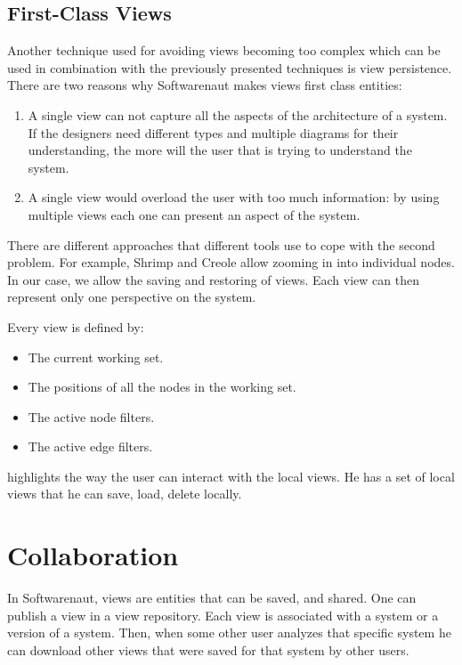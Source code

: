 \documentclass[preprint,12pt]{elsarticle}
\begin{document}
\newpage
\subsection {First-Class Views}

Another technique used for avoiding views becoming too complex which can be used in combination with the previously presented techniques is view persistence. There are two reasons why Softwarenaut makes views first class entities:

\begin{enumerate}
\item A single view can not capture all the aspects of the architecture of a system. If the designers need different types and multiple diagrams for their understanding, the more will the user that is trying to understand the system. 
\item A single view would overload the user with too much information: by using multiple views each one can present an aspect of the system.
\end{enumerate}

There are different approaches that different tools use to cope with the second problem. For example, Shrimp and Creole allow zooming in into individual nodes. In our case, we allow the saving and restoring of views. Each view can then represent only one perspective on the system. 

Every view is defined by:

\begin{itemize}
\item The current working set.
\item The positions of all the nodes in the working set.
\item The active node filters.
\item The active edge filters.
\end{itemize}


 highlights the way the user can interact with the local views. He has a set of local views that he can save, load, delete locally. 


\newpage
\section {Collaboration}
\label {sec:collab}

In Softwarenaut, views are entities that can be saved, and shared. One can publish a view in a view repository. Each view is associated with a system or a version of a system. Then, when some other user analyzes that specific system he can download other views that were saved for that system by other users. 
\end{document}

